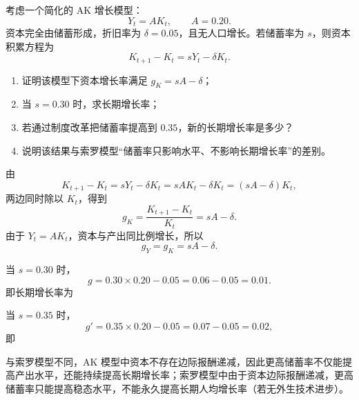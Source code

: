 \begin{question}
考虑一个简化的 AK 增长模型：
\[
Y_t=AK_t,\qquad A=0.20.
\]
资本完全由储蓄形成，折旧率为 $\delta=0.05$，且无人口增长。若储蓄率为 $s$，则资本积累方程为
\[
K_{t+1}-K_t=sY_t-\delta K_t.
\]

\begin{enumerate}[label=(\arabic*),leftmargin=2.5em]
  \item 证明该模型下资本增长率满足 $g_K=sA-\delta$；
  \item 当 $s=0.30$ 时，求长期增长率；
  \item 若通过制度改革把储蓄率提高到 $0.35$，新的长期增长率是多少？
  \item 说明该结果与索罗模型“储蓄率只影响水平、不影响长期增长率”的差别。
\end{enumerate}

\begin{solution}
由
\[
K_{t+1}-K_t=sY_t-\delta K_t=sAK_t-\delta K_t=(sA-\delta)K_t,
\]
两边同时除以 $K_t$，得到
\[
g_K=\frac{K_{t+1}-K_t}{K_t}=sA-\delta.
\]
由于 $Y_t=AK_t$，资本与产出同比例增长，所以
\[
g_Y=g_K=sA-\delta.
\]

当 $s=0.30$ 时，
\[
g=0.30\times 0.20-0.05=0.06-0.05=0.01.
\]
即长期增长率为

当 $s=0.35$ 时，
\[
g'=0.35\times 0.20-0.05=0.07-0.05=0.02,
\]
即

与索罗模型不同，AK 模型中资本不存在边际报酬递减，因此更高储蓄率不仅能提高产出水平，还能持续提高长期增长率；索罗模型中由于资本边际报酬递减，更高储蓄率只能提高稳态水平，不能永久提高长期人均增长率（若无外生技术进步）。
\end{solution}
\end{question}

